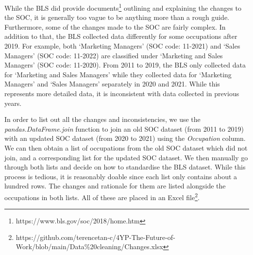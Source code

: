 \documentclass[11pt]{article}
\begin{document}
While the BLS did provide documents\footnote{https://www.bls.gov/soc/2018/home.htm} outlining and explaining the changes to the SOC, it is generally too vague to be anything more than a rough guide. Furthermore, some of the changes made to the SOC are fairly complex. In addition to that, the BLS collected data differently for some occupations after 2019. For example, both `Marketing Managers' (SOC code: 11-2021) and `Sales Managers' (SOC code: 11-2022) are classified under `Marketing and Sales Managers' (SOC code: 11-2020). From 2011 to 2019, the BLS only collected data for `Marketing and Sales Managers' while they collected data for `Marketing Managers' and `Sales Managers' separately in 2020 and 2021. While this represents more detailed data, it is inconsistent with data collected in previous years.

In order to list out all the changes and inconsistencies, we use the \emph{pandas.DataFrame.join} function to join an old SOC dataset (from 2011 to 2019) with an updated SOC dataset (from 2020 to 2021) using the \emph{Occupation} column. We can then obtain a list of occupations from the old SOC dataset which did not join, and a corresponding list for the updated SOC dataset. We then manually go through both lists and decide on how to standardise the BLS dataset. While this process is tedious, it is reasonably doable since each list only contains about a hundred rows. The changes and rationale for them are listed alongside the occupations in both lists. All of these are placed in an Excel file\footnote{https://github.com/terencetan-c/4YP-The-Future-of-Work/blob/main/Data\%20cleaning/Changes.xlsx}.
\end{document}
